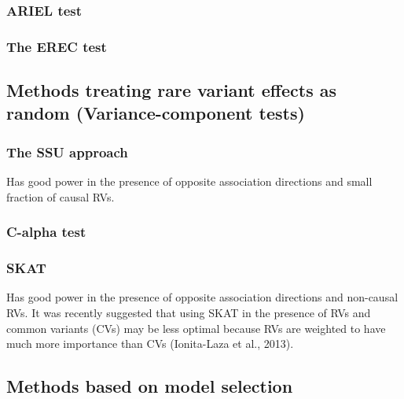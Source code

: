 \documentclass[
]{book}
\begin{document}
\hypertarget{ariel-test}{%
\subsubsection{ARIEL test}\label{ariel-test}}

\hypertarget{the-erec-test}{%
\subsubsection{The EREC test}\label{the-erec-test}}

\hypertarget{methods-treating-rare-variant-effects-as-random-variance-component-tests}{%
\subsection{Methods treating rare variant effects as random (Variance-component tests)}\label{methods-treating-rare-variant-effects-as-random-variance-component-tests}}

\hypertarget{the-ssu-approach}{%
\subsubsection{The SSU approach}\label{the-ssu-approach}}

Has good power in the presence of opposite association directions and small fraction of causal RVs.

\hypertarget{c-alpha-test}{%
\subsubsection{C-alpha test}\label{c-alpha-test}}

\hypertarget{skat}{%
\subsubsection{SKAT}\label{skat}}

Has good power in the presence of opposite association directions and non-causal RVs.
It was recently suggested that using SKAT in the presence of RVs and common variants (CVs) may be less optimal because RVs are weighted to have much more importance than CVs (Ionita-Laza et al., 2013).

\hypertarget{methods-based-on-model-selection}{%
\subsection{Methods based on model selection}\label{methods-based-on-model-selection}}
\end{document}
